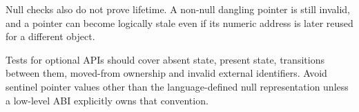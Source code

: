 Null checks also do not prove lifetime. A non-null dangling pointer is still invalid, and a pointer can become logically stale even if its numeric address is later reused for a different object.

Tests for optional APIs should cover absent state, present state, transitions between them, moved-from ownership and invalid external identifiers. Avoid sentinel pointer values other than the language-defined null representation unless a low-level ABI explicitly owns that convention.
